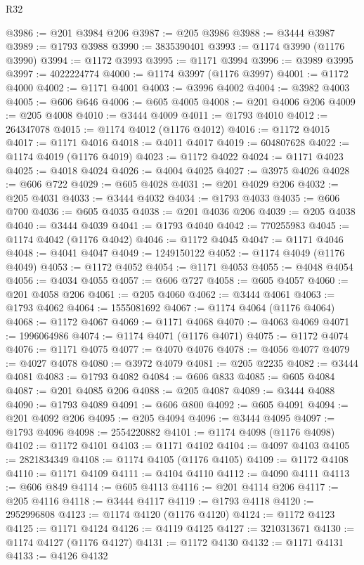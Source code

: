 \begin{lexlean}{R32}
\begin{coremodule}
@3986 := @201 @3984 @206
@3987 := @205 @3986
@3988 := @3444 @3987
@3989 := @1793 @3988
@3990 := 3835390401
@3993 := @1174 @3990 (@1176 @3990)
@3994 := @1172 @3993
@3995 := @1171 @3994
@3996 := @3989 @3995
@3997 := 4022224774
@4000 := @1174 @3997 (@1176 @3997)
@4001 := @1172 @4000
@4002 := @1171 @4001
@4003 := @3996 @4002
@4004 := @3982 @4003
@4005 := @606 @646
@4006 := @605 @4005
@4008 := @201 @4006 @206
@4009 := @205 @4008
@4010 := @3444 @4009
@4011 := @1793 @4010
@4012 := 264347078
@4015 := @1174 @4012 (@1176 @4012)
@4016 := @1172 @4015
@4017 := @1171 @4016
@4018 := @4011 @4017
@4019 := 604807628
@4022 := @1174 @4019 (@1176 @4019)
@4023 := @1172 @4022
@4024 := @1171 @4023
@4025 := @4018 @4024
@4026 := @4004 @4025
@4027 := @3975 @4026
@4028 := @606 @722
@4029 := @605 @4028
@4031 := @201 @4029 @206
@4032 := @205 @4031
@4033 := @3444 @4032
@4034 := @1793 @4033
@4035 := @606 @700
@4036 := @605 @4035
@4038 := @201 @4036 @206
@4039 := @205 @4038
@4040 := @3444 @4039
@4041 := @1793 @4040
@4042 := 770255983
@4045 := @1174 @4042 (@1176 @4042)
@4046 := @1172 @4045
@4047 := @1171 @4046
@4048 := @4041 @4047
@4049 := 1249150122
@4052 := @1174 @4049 (@1176 @4049)
@4053 := @1172 @4052
@4054 := @1171 @4053
@4055 := @4048 @4054
@4056 := @4034 @4055
@4057 := @606 @727
@4058 := @605 @4057
@4060 := @201 @4058 @206
@4061 := @205 @4060
@4062 := @3444 @4061
@4063 := @1793 @4062
@4064 := 1555081692
@4067 := @1174 @4064 (@1176 @4064)
@4068 := @1172 @4067
@4069 := @1171 @4068
@4070 := @4063 @4069
@4071 := 1996064986
@4074 := @1174 @4071 (@1176 @4071)
@4075 := @1172 @4074
@4076 := @1171 @4075
@4077 := @4070 @4076
@4078 := @4056 @4077
@4079 := @4027 @4078
@4080 := @3972 @4079
@4081 := @205 @2235
@4082 := @3444 @4081
@4083 := @1793 @4082
@4084 := @606 @833
@4085 := @605 @4084
@4087 := @201 @4085 @206
@4088 := @205 @4087
@4089 := @3444 @4088
@4090 := @1793 @4089
@4091 := @606 @800
@4092 := @605 @4091
@4094 := @201 @4092 @206
@4095 := @205 @4094
@4096 := @3444 @4095
@4097 := @1793 @4096
@4098 := 2554220882
@4101 := @1174 @4098 (@1176 @4098)
@4102 := @1172 @4101
@4103 := @1171 @4102
@4104 := @4097 @4103
@4105 := 2821834349
@4108 := @1174 @4105 (@1176 @4105)
@4109 := @1172 @4108
@4110 := @1171 @4109
@4111 := @4104 @4110
@4112 := @4090 @4111
@4113 := @606 @849
@4114 := @605 @4113
@4116 := @201 @4114 @206
@4117 := @205 @4116
@4118 := @3444 @4117
@4119 := @1793 @4118
@4120 := 2952996808
@4123 := @1174 @4120 (@1176 @4120)
@4124 := @1172 @4123
@4125 := @1171 @4124
@4126 := @4119 @4125
@4127 := 3210313671
@4130 := @1174 @4127 (@1176 @4127)
@4131 := @1172 @4130
@4132 := @1171 @4131
@4133 := @4126 @4132

\end{coremodule}
\end{lexlean}
